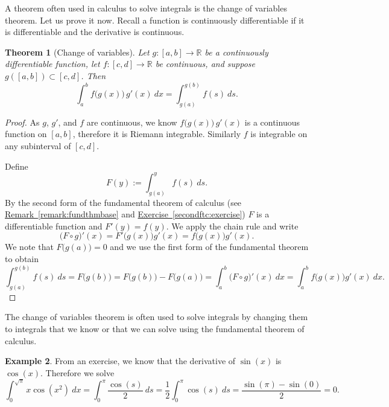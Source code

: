 \documentclass[12pt]{book}
\newcommand{\R}{{\mathbb{R}}}
\theoremstyle{plain}
\newtheorem{thm}{Theorem}[section]
\theoremstyle{remark}
\theoremstyle{definition}
\theoremstyle{exercise}
\theoremstyle{example}
\newtheorem{example}[thm]{Example}
\newcommand{\exerciseref}[1]{\hyperref[#1]{Exercise~\ref*{#1}}}
\newcommand{\remarkref}[1]{\hyperref[#1]{Remark~\ref*{#1}}}
\begin{document}
A theorem often used in calculus to solve integrals is the change of
variables theorem.  Let us prove it now.  Recall 
a function is continuously differentiable if
it is differentiable and the derivative is continuous.

\begin{thm}[Change of variables]
Let $g \colon [a,b] \to \R$ be a continuously differentiable function,
let $f \colon [c,d] \to \R$ be continuous, and suppose
$g([a,b]) \subset [c,d]$.  Then
\begin{equation*}
\int_a^b f\bigl(g(x)\bigr)\, g'(x)~ dx =
\int_{g(a)}^{g(b)} f(s)~ ds .
\end{equation*}
\end{thm}

\begin{proof}
As $g$, $g'$, and $f$ are continuous, we know $f\bigl(g(x)\bigr)\,g'(x)$
is a continuous function on $[a,b]$, therefore it is Riemann integrable.
Similarly $f$ is integrable on any subinterval of $[c,d]$.

Define 
\begin{equation*}
F(y) := \int_{g(a)}^{y} f(s)~ds .
\end{equation*}
By the second form of the fundamental
theorem of calculus (see \remarkref{remark:fundthmbase} and \exerciseref{secondftc:exercise})
$F$ is a differentiable function and $F'(y) = f(y)$.  We apply the chain
rule and write
\begin{equation*}
\bigl( F \circ g \bigr)' (x) =
F'\bigl(g(x)\bigr) g'(x)
=
f\bigl(g(x)\bigr) g'(x) .
\end{equation*}
We note that $F\bigl(g(a)\bigr) = 0$ and we
use the first form of the fundamental theorem
to obtain
\begin{equation*}
\int_{g(a)}^{g(b)} f(s)~ds = F\bigl(g(b)\bigr) = F\bigl(g(b)\bigr)-F\bigl(g(a)\bigr)
=
\int_a^b 
\bigl( F \circ g \bigr)' (x) ~dx
=
\int_a^b 
f\bigl(g(x)\bigr) g'(x)
~dx .  %
\end{equation*}
\end{proof}

The change of variables theorem is often used to solve integrals by changing them
to integrals that we know or that we can solve using the fundamental theorem of
calculus.

\begin{example}
From an exercise, we know that the derivative of $\sin(x)$ is $\cos(x)$.
Therefore we solve
\begin{equation*}
\int_0^{\sqrt{\pi}} x \cos(x^2) ~ dx = \int_0^\pi \frac{\cos(s)}{2} ~ ds
=
\frac{1}{2}
\int_0^\pi \cos(s) ~ ds
=
\frac{
\sin(\pi) - \sin(0)
}{2}
=
0 .
\end{equation*}
\end{example}
\end{document}
